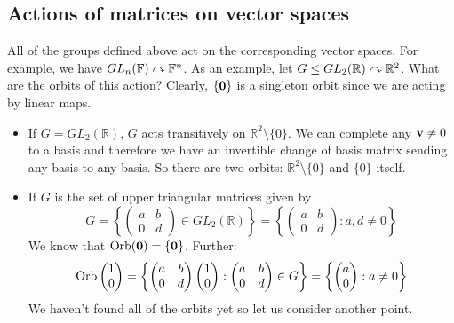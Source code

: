 \subsection{Actions of matrices on vector spaces}
All of the groups defined above act on the corresponding vector spaces.
For example, we have \(GL_n(\mathbb F) \curvearrowright \mathbb F^n\).
As an example, let \(G \leq GL_2(\mathbb R) \curvearrowright \mathbb R^2\).
What are the orbits of this action?
Clearly, \(\{ \vb 0 \}\) is a singleton orbit since we are acting by linear maps.
\begin{itemize}
	\item If \(G = GL_2(\mathbb R)\), \(G\) acts transitively on \(\mathbb R^2 \setminus \{ 0 \}\).
	      We can complete any \(\vb v \neq 0\) to a basis and therefore we have an invertible change of basis matrix sending any basis to any basis.
	      So there are two orbits: \(\mathbb R^2 \setminus \{ 0 \}\) and \(\{ 0 \}\) itself.
	\item If \(G\) is the set of upper triangular matrices given by
	      \[
		      G = \left\{ \begin{pmatrix}
			      a & b \\ 0 & d
		      \end{pmatrix} \in GL_2(\mathbb R) \right\} = \left\{ \begin{pmatrix}
			      a & b \\ 0 & d
		      \end{pmatrix}: a, d \neq 0 \right\}
	      \]
	      We know that \(\operatorname{Orb}(\vb 0) = \{ \vb 0 \}\).
	      Further:
	      \[
		      \operatorname{Orb}\begin{pmatrix}
			      1 \\ 0
		      \end{pmatrix} = \left\{ \begin{pmatrix}
			      a & b \\ 0 & d
		      \end{pmatrix} \begin{pmatrix}
			      1 \\ 0
		      \end{pmatrix}: \begin{pmatrix}
			      a & b \\ 0 & d
		      \end{pmatrix} \in G \right\} = \left\{ \begin{pmatrix}
			      a \\ 0
		      \end{pmatrix}: a \neq 0 \right\}
	      \]
	      We haven't found all of the orbits yet so let us consider another point.

\end{itemize}
